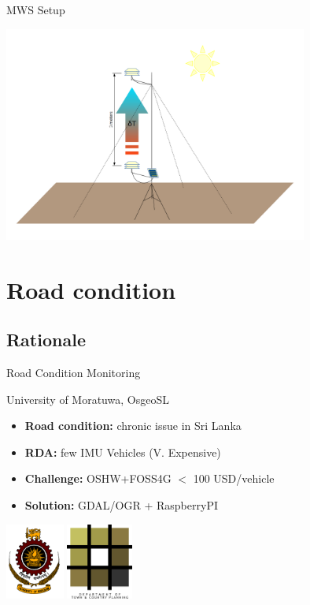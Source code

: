 \documentclass[xcolor=dvipsnames,beamer]{beamer} %
\begin{document}
\begin{frame}[fragile]{MWS Setup}

\begin{center}
 \includegraphics[width=10cm]{MWS_v1_deltaT_sketch_hot}
\end{center}

\end{frame}

\section{Road condition}
\subsection{Rationale}
\begin{frame}[fragile]{Road Condition Monitoring}

University of Moratuwa, OsgeoSL\\
\vspace{5mm}
\begin{itemize}
 \item {\bf Road condition:} chronic issue in Sri Lanka
 \item {\bf RDA:} few IMU Vehicles (V. Expensive)
 \item {\bf Challenge:} OSHW+FOSS4G $<$ 100 USD/vehicle 
 \item {\bf Solution:} GDAL/OGR + RaspberryPI
\end{itemize}
\vspace{5mm}
\begin{flushleft}
 \includegraphics[height=2.5cm]{uoMoratuwa}
 \hspace{5mm}
 \includegraphics[height=2.5cm]{uoMoratuwa_foa}
 \hspace{15mm}
\end{flushleft}
\end{frame}
\end{document}
